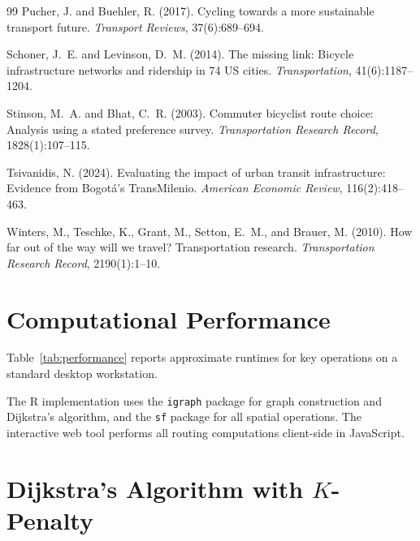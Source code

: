 \documentclass[12pt,a4paper]{article}
\begin{document}
\begin{thebibliography}{99}
Pucher, J. and Buehler, R. (2017).
\newblock Cycling towards a more sustainable transport future.
\newblock \textit{Transport Reviews}, 37(6):689--694.

Schoner, J.~E. and Levinson, D.~M. (2014).
\newblock The missing link: Bicycle infrastructure networks and ridership in 74 {US} cities.
\newblock \textit{Transportation}, 41(6):1187--1204.

Stinson, M.~A. and Bhat, C.~R. (2003).
\newblock Commuter bicyclist route choice: Analysis using a stated preference survey.
\newblock \textit{Transportation Research Record}, 1828(1):107--115.

Tsivanidis, N. (2024).
\newblock Evaluating the impact of urban transit infrastructure: Evidence from {B}ogot\'{a}'s {T}rans{M}ilenio.
\newblock \textit{American Economic Review}, 116(2):418--463.

Winters, M., Teschke, K., Grant, M., Setton, E.~M., and Brauer, M. (2010).
\newblock How far out of the way will we travel? {T}ransportation research.
\newblock \textit{Transportation Research Record}, 2190(1):1--10.

\end{thebibliography}

\appendix

\section{Computational Performance}
\label{app:performance}

Table~\ref{tab:performance} reports approximate runtimes for key operations on a standard desktop workstation.



\noindent The R implementation uses the \texttt{igraph} package for graph construction and Dijkstra's algorithm, and the \texttt{sf} package for all spatial operations. The interactive web tool performs all routing computations client-side in JavaScript.

\section{Dijkstra's Algorithm with $K$-Penalty}
\label{app:algorithm}
\end{document}
